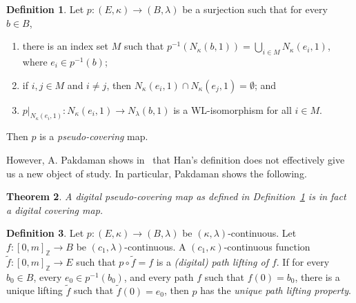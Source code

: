 \documentclass{article} \UseRawInputEncoding
\theoremstyle{plain}
\newtheorem{thm}{Theorem}
\theoremstyle{definition}
\newtheorem{definition}[thm]{Definition}
\numberwithin{thm}{section}
\def\Z{{\mathbb Z}}
\begin{document}
\begin{definition}
\label{HanPseudocover}
{\rm \cite{HanUnique}}
    Let $p: (E,\kappa) \to (B,\lambda)$ be a surjection
    such that for every $b \in B$,
    \begin{enumerate}
        \item there is an index set $M$ such that
              $p^{-1} (N_{\kappa}(b,1)) = 
              \bigcup_{i \in M} N_{\kappa}(e_i,1)$, where
              $e_i \in p^{-1}(b)$;
        \item if $i,j \in M$ and $i \neq j$, then
              $N_{\kappa}(e_i,1) \cap N_{\kappa}(e_j,1) =
              \emptyset$; and
        \item $p|_{N_{\kappa}(e_i,1)}: N_{\kappa}(e_i,1) \to
               N_{\lambda}(b,1)$ is a WL-isomorphism for 
               all $i \in M$.
    \end{enumerate}
    Then $p$ is a {\em pseudo-covering} map.
\end{definition}

However, A. Pakdaman shows in~\cite{Pak22} that Han's definition
does not effectively give us a new object of study.
In particular, Pakdaman shows the following.

\begin{thm}
{\rm \cite{Pak22}}
\label{pseudoCoverIsCover}
    A digital pseudo-covering map as defined in
    Definition~\ref{HanPseudocover} is in fact a digital covering map.
\end{thm}

\begin{definition}
    {\rm \cite{Han05}} Let $p: (E,\kappa) \to (B,\lambda)$
    be $(\kappa,\lambda)$-continuous. Let 
    $f: [0,m]_{\Z} \to B$ be $(c_1, \lambda)$-continuous.
    A $(c_1,\kappa)$-continuous function 
    $\tilde{f}: [0,m]_{\Z} \to E$ such that
    $p \circ \tilde{f} = f$ is a 
    {\em (digital) path lifting of $f$}. If for every
    $b_0 \in B$, every $e_0 \in p^{-1}(b_0)$, and every
    path $f$ such that $f(0)=b_0$, there is a unique
    lifting $\tilde{f}$ such that $\tilde{f}(0)=e_0$,
    then $p$ has the {\em unique path lifting property}.
\end{definition}

\end{document}

